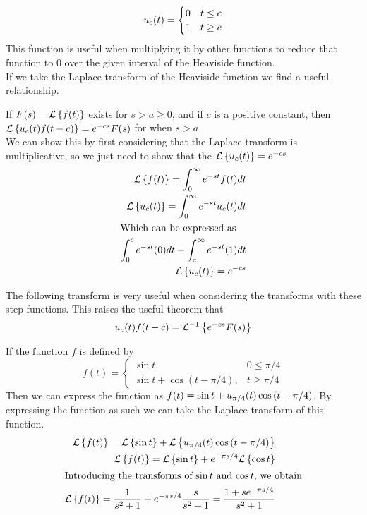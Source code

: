 \[
u_{c} (t) =
\begin{cases}
0 & t \leq c \\
1 & t \geq c \\
\end{cases}
\]
This function is useful when multiplying it by other functions to reduce that function to 0 over the given interval of the Heaviside function. \\
If we take the Laplace transform of the Heaviside function we find a useful relationship. 
\begin{example}
	If $ F(s) = \mathcal{L} \left\{ f(t) \right\} $ exists for $ s > a \geq  0$, and if $ c $ is a positive constant, then $ \mathcal{L} \left\{ u_{c} (t) f(t-c) \right\} = e^{-cs} F(s) $ for when $ s > a $ \\
	We can show this by first considering that the Laplace transform is multiplicative, so we just need to show that the $ \mathcal{L} \left\{ u_{c} (t) \right\} = e^{-cs} $
	\begin{align*}
		\mathcal{L} \left\{ f(t) \right\} = \int^\infty_0 e^{-st} f(t) dt \\
		\mathcal{L} \left\{ u_{c} (t) \right\} = \int^\infty_0 e^{-st} u_{c} (t) dt \\
		\intertext{Which can be expressed as}
		\int_{0}^c e^{-st} (0) dt + \int_{c}^\infty e^{-st} (1) dt \\
		\mathcal{L} \left\{ u_{c} (t) \right\} = e^{-cs} 
	\end{align*}
	
\end{example}
The following transform is very useful when considering the transforms with these step functions. This raises the useful theorem that $$ u_c(t)f(t-c) = \mathcal{L}^{-1} \left\{ e^{-cs}F(s) \right\} $$
\begin{example}
		If the function $ f $ is defined by \[ 
		f(t)  = 
		\begin{cases}
			\sin t, & 0 \leq \pi / 4 \\
			\sin t + \cos (t- \pi/4), & t \geq \pi / 4
		\end{cases}
		\]
		Then we can express the function as $ f(t) = \sin t + u_{\pi / 4} (t) \cos{(t- \pi / 4)} $. By expressing the function as such we can take the Laplace transform of this function.  
		\begin{align*}
			\mathcal{L} \left\{ f(t) \right\} = \mathcal{L} \left\{ \sin t \right\} + \mathcal{L} \left\{ u_{\pi / 4} (t) \cos{(t- \pi / 4)} \right\} \\
			\mathcal{L} \left\{ f(t) \right\} = \mathcal{L} \left\{ \sin t \right\} + e^{-\pi s / 4}\mathcal{L} \left\{ \cos{t} \right\} \\
			\intertext{Introducing the transforms of $ \sin t $ and $  \cos t $, we obtain} 
			\mathcal{L} \left\{ f(t) \right\} = \dfrac{1}{s^2 + 1} + e^{-\pi s / 4} \dfrac{s}{s^2 + 1} = \dfrac{1 + se^{-\pi s / 4}}{s^2 + 1}
		\end{align*}
\end{example}



